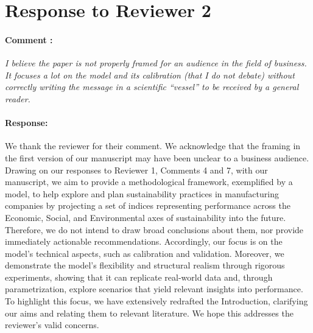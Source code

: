 \documentclass[11pt]{article}
\newcommand{\ReviewerComment}[1]{\paragraph*{Comment \stepcounter{NumComment}\arabic{NumComment}:} \textit{#1}}
\newcommand{\AuthorResponse}{\paragraph*{Response:}}
\begin{document}
    \hrulefill
    
	\section*{Response to Reviewer 2}
    \setcounter{NumComment}{0}

    

    \ReviewerComment{I believe the paper is not properly framed for an audience in the field of business. It focuses a lot on the model and its calibration (that I do not debate) without correctly writing the message in a scientific ``vessel'' to be received by a general reader.}
    
    \AuthorResponse{We thank the reviewer for their comment. We acknowledge that the framing in the first version of our manuscript may have been unclear to a business audience. Drawing on our responses to Reviewer 1, Comments 4 and 7, with our manuscript, we aim to provide a methodological framework, exemplified by a model, to help explore and plan sustainability practices in manufacturing companies by projecting a set of indices representing performance across the Economic, Social, and Environmental axes of sustainability into the future. Therefore, we do not intend to draw broad conclusions about them, nor provide immediately actionable recommendations. Accordingly, our focus is on the model's technical aspects, such as calibration and validation. Moreover, we demonstrate the model's flexibility and structural realism through rigorous experiments, showing that it can replicate real-world data and, through parametrization, explore scenarios that yield relevant insights into performance. To highlight this focus, we have extensively redrafted the Introduction, clarifying our aims and relating them to relevant literature. We hope this addresses the reviewer's valid concerns.}
    
\end{document}
